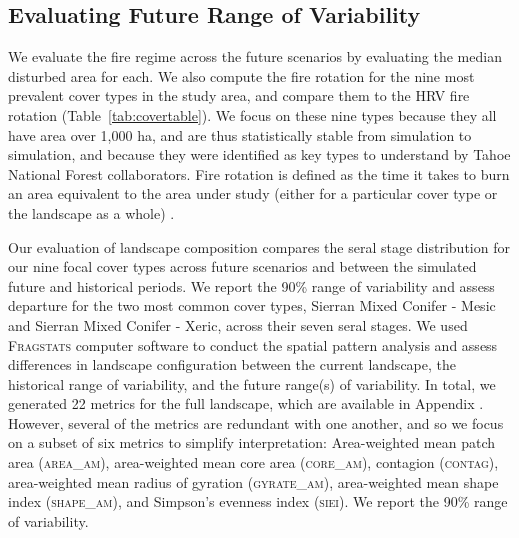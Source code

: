 \documentclass[12pt]{article}
\begin{document}
\begin{spacing}{1}
\subsection*{Evaluating Future Range of Variability}
We evaluate the fire regime across the future scenarios by evaluating the median disturbed area for each. We also compute the fire rotation for the nine most prevalent cover types in the study area, and compare them to the HRV fire rotation (Table~\ref{tab:covertable}). We focus on these nine types because they all have area over 1,000 ha, and are thus statistically stable from simulation to simulation, and because they were identified as key types to understand by Tahoe National Forest collaborators. Fire rotation is defined as the time it takes to burn an area equivalent to the area under study (either for a particular cover type or the landscape as a whole) \citep{Agee1993}.%
%


Our evaluation of landscape composition compares the seral stage distribution for our nine focal cover types across future scenarios and between the simulated future and historical periods. We report the 90\% range of variability and assess departure for the two most common cover types, Sierran Mixed Conifer - Mesic and Sierran Mixed Conifer - Xeric, across their seven seral stages.
%
%
We used \textsc{Fragstats} computer software \citep{Fragstats2012} to conduct the spatial pattern analysis and assess differences in landscape configuration between the current landscape, the historical range of variability, and the future range(s) of variability. In total, we generated 22 metrics for the full landscape, which are available in Appendix . However, several of the metrics are redundant with one another, and so we focus on a subset of six metrics to simplify interpretation: Area-weighted mean patch area (\textsc{area\_am}), area-weighted mean core area (\textsc{core\_am}), contagion (\textsc{contag}), area-weighted mean radius of gyration (\textsc{gyrate\_am}), area-weighted mean shape index (\textsc{shape\_am}), and Simpson's evenness index (\textsc{siei}). We report the 90\% range of variability. %


\end{spacing}
\end{document}
